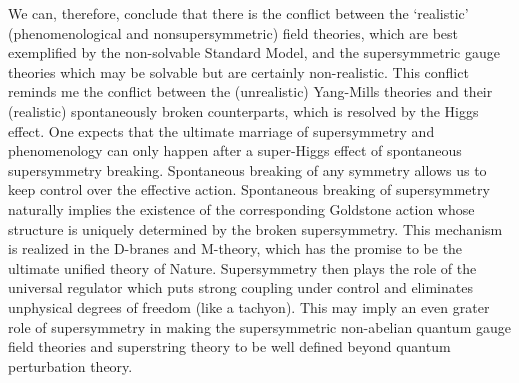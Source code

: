 \documentclass[a4paper,a4paper]{article}
\begin{document}
We can, therefore, conclude that there is the conflict between the `realistic'
 (phenomenological and nonsupersymmetric) field theories, which are 
best exemplified by the non-solvable Standard Model, and the supersymmetric 
gauge theories which may be solvable but are certainly non-realistic. This
conflict reminds me the conflict between the (unrealistic) Yang-Mills 
theories and their (realistic) spontaneously broken counterparts, which is
resolved by the Higgs effect. One expects that the ultimate marriage
of supersymmetry and phenomenology can only happen after a super-Higgs
effect of spontaneous supersymmetry breaking. Spontaneous breaking of any
symmetry allows us to keep control over the effective action. Spontaneous
breaking of supersymmetry naturally implies the existence of the corresponding
Goldstone action whose structure is uniquely determined by the broken
supersymmetry. This mechanism is realized in the D-branes and M-theory, which
has the promise to be the ultimate unified theory of Nature. Supersymmetry 
then plays the role of the universal regulator which puts strong coupling under
control and eliminates unphysical degrees of freedom (like a tachyon). This
may imply an even grater role of supersymmetry in making the supersymmetric 
non-abelian quantum gauge field theories and superstring theory to be well 
defined beyond quantum perturbation theory.  
\end{document}
